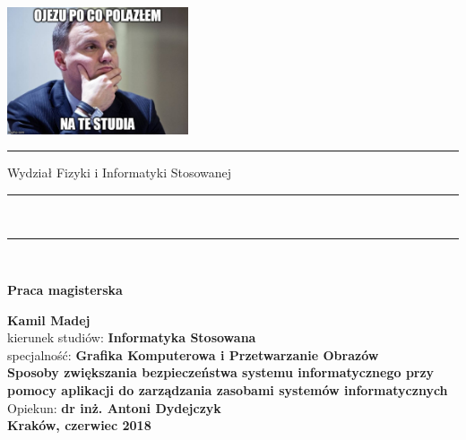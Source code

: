 \documentclass[a4paper,12pt,twoside]{article}
\begin{document}
\thispagestyle{empty}
\includegraphics[height=37.5mm]{dudel.jpg}\\
\rule{30mm}{0pt}
{\large \textsf{Wydział Fizyki i Informatyki Stosowanej}}\\
\rule{\textwidth}{3pt}\\
\rule[2ex]
{\textwidth}{1pt}\\

\vspace{1ex}

\begin{center}
{\LARGE \bf \textsf{Praca magisterska}}\\

\vspace{10ex}

{\bf \Large \textsf{Kamil Madej}}\\
\vspace{3ex}
{\sf\small kierunek studiów:} {\bf\small \textsf{Informatyka Stosowana}}\\
\vspace{1.5ex}
{\sf\small specjalność:} {\bf\small \textsf{Grafika Komputerowa i Przetwarzanie Obrazów}}\\
\vspace{10ex}
{\bf \huge \textsf{Sposoby zwiększania bezpieczeństwa systemu informatycznego przy pomocy aplikacji do zarządzania zasobami systemów informatycznych}}\\
\vspace{10ex}
{\Large Opiekun: \bf \textsf{dr inż. Antoni Dydejczyk}}\\
\vspace{10ex}
{\large \bf \textsf{Kraków, czerwiec 2018}}
\end{center}
\end{document}
